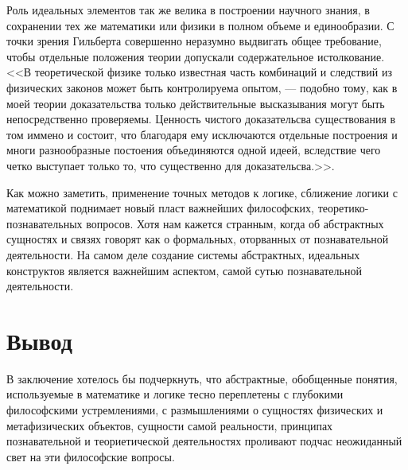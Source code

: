 \documentclass[a4page]{article}
\begin{document}
Роль идеальных элементов так же велика в построении научного знания,
в сохранении тех же математики или физики в полном объеме и единообразии.
С точки зрения Гильберта совершенно неразумно выдвигать общее требование,
чтобы отдельные положения теории допускали содержательное истолкование.
<<В теоретической физике только известная часть комбинаций и следствий
из физических законов может быть контролируема опытом, --- подобно тому,
как в моей теории доказательства только действительные высказывания
могут быть непосредственно проверяемы.
Ценность чистого доказательсва существования в том иммено и состоит,
что благодаря ему исключаются отдельные построения и многи разнообразные постоения объединяются одной идеей,
вследствие чего четко выступает только то, что существенно для доказательсва.>>\cite{the-foundations-of-geometry}.

Как можно заметить, применение точных методов к логике,
сближение логики с математикой поднимает новый пласт важнейших философских,
теоретико-познавательных вопросов.
Хотя нам кажется странным, когда об абстрактных сущностях и связях
говорят как о формальных, оторванных от познавательной деятельности.
На самом деле создание системы абстрактных,
идеальных конструктов является важнейшим аспектом, самой сутью познавательной деятельности.

\section{Вывод}
В заключение хотелось бы подчеркнуть, что абстрактные, обобщенные понятия,
используемые в математике и логике тесно переплетены с глубокими философскими устремлениями,
с размышлениями о сущностях физических и метафизических объектов, сущности самой реальности,
принципах познавательной и теориетической деятельностях
проливают подчас неожиданный свет на эти философские вопросы.

\newpage
{}
\printbibliography
\end{document}
